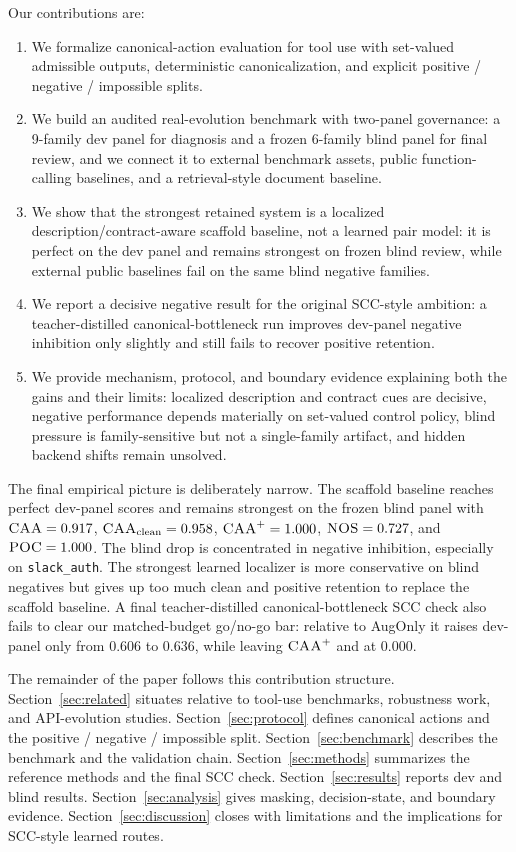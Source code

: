 Our contributions are:
\begin{enumerate}[leftmargin=1.5em]
    \item We formalize canonical-action evaluation for tool use with set-valued admissible outputs, deterministic canonicalization, and explicit positive / negative / impossible splits.
    \item We build an audited real-evolution benchmark with two-panel governance: a 9-family dev panel for diagnosis and a frozen 6-family blind panel for final review, and we connect it to external benchmark assets, public function-calling baselines, and a retrieval-style document baseline.
    \item We show that the strongest retained system is a localized description/contract-aware scaffold baseline, not a learned pair model: it is perfect on the dev panel and remains strongest on frozen blind review, while external public baselines fail on the same blind negative families.
    \item We report a decisive negative result for the original SCC-style ambition: a teacher-distilled canonical-bottleneck run improves dev-panel negative inhibition only slightly and still fails to recover positive retention.
    \item We provide mechanism, protocol, and boundary evidence explaining both the gains and their limits: localized description and contract cues are decisive, negative performance depends materially on set-valued control policy, blind pressure is family-sensitive but not a single-family artifact, and hidden backend shifts remain unsolved.
\end{enumerate}

The final empirical picture is deliberately narrow. The scaffold baseline reaches perfect dev-panel scores and remains strongest on the frozen blind panel with $\textsc{CAA}=0.917$, $\textsc{CAA}_\text{clean}=0.958$, $\textsc{CAA}^{+}=1.000$, $\textsc{NOS}=0.727$, and $\textsc{POC}=1.000$. The blind drop is concentrated in negative inhibition, especially on \texttt{slack\_auth}. The strongest learned localizer is more conservative on blind negatives but gives up too much clean and positive retention to replace the scaffold baseline. A final teacher-distilled canonical-bottleneck SCC check also fails to clear our matched-budget go/no-go bar: relative to AugOnly it raises dev-panel \NOS{} only from $0.606$ to $0.636$, while leaving $\textsc{CAA}^{+}$ and \POC{} at $0.000$.

The remainder of the paper follows this contribution structure. Section~\ref{sec:related} situates \toolshift{} relative to tool-use benchmarks, robustness work, and API-evolution studies. Section~\ref{sec:protocol} defines canonical actions and the positive / negative / impossible split. Section~\ref{sec:benchmark} describes the benchmark and the validation chain. Section~\ref{sec:methods} summarizes the reference methods and the final SCC check. Section~\ref{sec:results} reports dev and blind results. Section~\ref{sec:analysis} gives masking, decision-state, and boundary evidence. Section~\ref{sec:discussion} closes with limitations and the implications for SCC-style learned routes.

